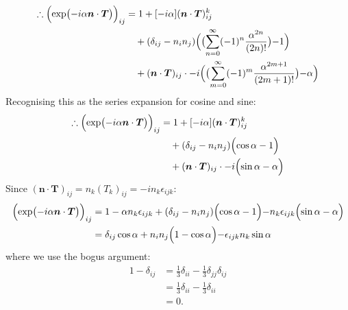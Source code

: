 \begin{enumerate}
    \begin{align*}
        \therefore\Bigl(\exp\bigl(-i\alpha\boldsymbol{n}\cdot\boldsymbol{T}\bigl)\Bigl)_{ij}
        &=1+[-i\alpha](\boldsymbol{n}\cdot\boldsymbol{T})^k_{ij} \\
        &\quad+(\delta_{ij}-n_i n_j)\Bigl(\bigl(\sum_{n=0}^{\infty}(-1)^n
        \frac{\alpha^{2n}}{(2n)!}\bigl)-1\Bigl) \\
        &\quad+(\boldsymbol{n}\cdot\boldsymbol{T})_{ij}\cdot
        -i\Bigl(\bigl(\sum_{m=0}^{\infty}(-1)^m\frac{\alpha^{2m+1}}{(2m+1)!}
        \bigl)-\alpha\Bigl)
    \end{align*}
    Recognising this as the series expansion for cosine and sine:
    \begin{align*}
        \therefore\Bigl(\exp\bigl(-i\alpha\boldsymbol{n}\cdot\boldsymbol{T}\bigl)\Bigl)_{ij}
        &=1+[-i\alpha](\boldsymbol{n}\cdot\boldsymbol{T})^k_{ij} \\
        &\quad+(\delta_{ij}-n_i n_j)\Bigl(\cos\alpha-1\Bigl) \\
        &\quad+(\boldsymbol{n}\cdot\boldsymbol{T})_{ij}\cdot
        -i\Bigl(\sin\alpha-\alpha\Bigl)
    \end{align*}
    Since $(\boldsymbol{n}\cdot\boldsymbol{T})_{ij}=n_k(T_k)_{ij}=-i n_k\epsilon_{ijk}$:
    \begin{align*}
        \Bigl(\exp\bigl(-i\alpha\boldsymbol{n}\cdot\boldsymbol{T}\bigl)\Bigl)_{ij}
        &=1-\alpha n_k\epsilon_{ijk}
        +(\delta_{ij}-n_i n_j)\Bigl(\cos\alpha-1\Bigl)
        -n_k\epsilon_{ijk}\Bigl(\sin\alpha-\alpha\Bigl) \\
        &=\delta_{ij}\cos\alpha+n_i n_j\Bigl(1-\cos\alpha\Bigl)
        -\epsilon_{ijk}n_k\sin\alpha
    \end{align*}
    where we use the bogus argument:
    \begin{align*}
        1-\delta_{ij}
        &=\frac{1}{3}\delta_{ii}-\frac{1}{3}\delta_{jj}\delta_{ij} \\
        &=\frac{1}{3}\delta_{ii}-\frac{1}{3}\delta_{ii} \\
        &=0.
    \end{align*}
\end{enumerate}